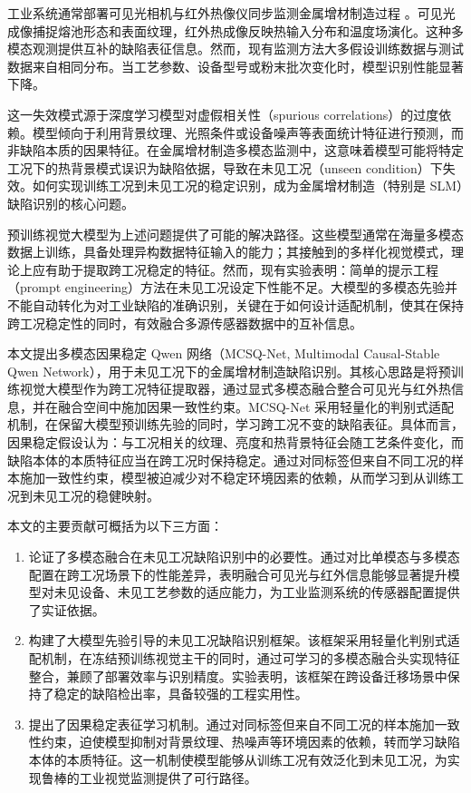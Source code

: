 \documentclass[journal]{IEEEtran}
\begin{document}
工业系统通常部署可见光相机与红外热像仪同步监测金属增材制造过程 \cite{ref_lpbf_sensing_review,ref_intelligent_defect_pbf}。可见光成像捕捉熔池形态和表面纹理，红外热成像反映热输入分布和温度场演化。这种多模态观测提供互补的缺陷表征信息。然而，现有监测方法大多假设训练数据与测试数据来自相同分布。当工艺参数、设备型号或粉末批次变化时，模型识别性能显著下降。

这一失效模式源于深度学习模型对虚假相关性（spurious correlations）的过度依赖。模型倾向于利用背景纹理、光照条件或设备噪声等表面统计特征进行预测，而非缺陷本质的因果特征。在金属增材制造多模态监测中，这意味着模型可能将特定工况下的热背景模式误识为缺陷依据，导致在未见工况（unseen condition）下失效。如何实现训练工况到未见工况的稳定识别，成为金属增材制造（特别是 SLM）缺陷识别的核心问题。

预训练视觉大模型为上述问题提供了可能的解决路径。这些模型通常在海量多模态数据上训练，具备处理异构数据特征输入的能力；其接触到的多样化视觉模式，理论上应有助于提取跨工况稳定的特征。然而，现有实验表明：简单的提示工程（prompt engineering）方法在未见工况设定下性能不足。大模型的多模态先验并不能自动转化为对工业缺陷的准确识别，关键在于如何设计适配机制，使其在保持跨工况稳定性的同时，有效融合多源传感器数据中的互补信息。

本文提出多模态因果稳定 Qwen 网络（MCSQ-Net, Multimodal Causal-Stable Qwen Network），用于未见工况下的金属增材制造缺陷识别。其核心思路是将预训练视觉大模型作为跨工况特征提取器，通过显式多模态融合整合可见光与红外热信息，并在融合空间中施加因果一致性约束。MCSQ-Net 采用轻量化的判别式适配机制，在保留大模型预训练先验的同时，学习跨工况不变的缺陷表征。具体而言，因果稳定假设认为：与工况相关的纹理、亮度和热背景特征会随工艺条件变化，而缺陷本体的本质特征应当在跨工况时保持稳定。通过对同标签但来自不同工况的样本施加一致性约束，模型被迫减少对不稳定环境因素的依赖，从而学习到从训练工况到未见工况的稳健映射。

本文的主要贡献可概括为以下三方面：
\begin{enumerate}
\item 论证了多模态融合在未见工况缺陷识别中的必要性。通过对比单模态与多模态配置在跨工况场景下的性能差异，表明融合可见光与红外信息能够显著提升模型对未见设备、未见工艺参数的适应能力，为工业监测系统的传感器配置提供了实证依据。
\item 构建了大模型先验引导的未见工况缺陷识别框架。该框架采用轻量化判别式适配机制，在冻结预训练视觉主干的同时，通过可学习的多模态融合头实现特征整合，兼顾了部署效率与识别精度。实验表明，该框架在跨设备迁移场景中保持了稳定的缺陷检出率，具备较强的工程实用性。
\item 提出了因果稳定表征学习机制。通过对同标签但来自不同工况的样本施加一致性约束，迫使模型抑制对背景纹理、热噪声等环境因素的依赖，转而学习缺陷本体的本质特征。这一机制使模型能够从训练工况有效泛化到未见工况，为实现鲁棒的工业视觉监测提供了可行路径。
\end{enumerate}
\end{document}
